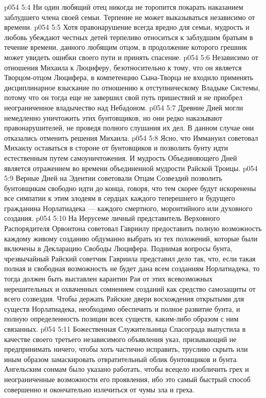 \vs p054 5:4 \pc {}\bibnobreakspace Ни один любящий отец никогда не торопится покарать наказанием заблудшего члена своей семьи. Терпение не может выказываться независимо от времени.
\vs p054 5:5 \pc {}\bibnobreakspace Хотя правонарушение всегда вредно для семьи, мудрость и любовь убеждают честных детей терпеливо относиться к заблудшим братьям в течение времени, данного любящим отцом, в продолжение которого грешник может увидеть ошибки своего пути и принять спасение.
\vs p054 5:6 \pc {}\bibnobreakspace Независимо от отношения Михаила к Люциферу, безотносительно к тому, что он является Творцом\hyp{}отцом Люцифера, в компетенцию Сына\hyp{}Творца не входило применять дисциплинарное взыскание по отношению к отступническому Владыке Системы, потому что он тогда еще не завершил свой путь пришествий и не приобрел неограниченное владычество над Небадоном.
\vs p054 5:7 \pc {}\bibnobreakspace Древние Дней могли немедленно уничтожить этих бунтовщиков, но они редко наказывают правонарушителей, не проведя полного слушания их дел. В данном случае они отказались отменить решения Михаила.
\vs p054 5:8 \pc {}\bibnobreakspace Ясно, что Иммануил советовал Михаилу оставаться в стороне от бунтовщиков и позволить бунту идти естественным путем самоуничтожения. И мудрость Объединяющего Дней является отражением во времени объединенной мудрости Райской Троицы.
\vs p054 5:9 \pc {}\bibnobreakspace Верные Дней на Эдентии советовали Отцам Созвездий позволить бунтовщикам свободно идти до конца, говоря, что тем скорее будут искоренены все симпатии к этим злодеям в сердцах каждого теперешнего и будущего гражданина Норлатиадека --- каждого смертного, моронтийного или духовного создания.
\vs p054 5:10 \pc {}\bibnobreakspace На Иерусеме личный представитель Верховного Распорядителя Орвонтона советовал Гавриилу предоставить полную возможность каждому живому созданию обдуманно выбрать из тех положений, которые были включены в Декларацию Свободы Люцифера. Поднимая вопросы бунта, чрезвычайный Райский советчик Гавриила представил дело так, что, если такая полная и свободная возможность не будет дана всем созданиям Норлатиадека, то тогда должен быть выставлен карантин Рая от этих всевозможных нерешительных и охваченных сомнением созданий как средство самозащиты от всего созвездия. Чтобы держать Райские двери восхождения открытыми для существ Норлатиадека, необходимо обеспечить и полное развитие бунта, и полную определенность позиции всех существ, каким\hyp{}либо образом с ним связанных.
\vs p054 5:11 \pc {}\bibnobreakspace Божественная Служительница Спасограда выпустила в качестве своего третьего независимого объявления указ, призывающий не предпринимать ничего, чтобы хоть частично исправить, трусливо скрыть или иным образом замаскировать отвратительный облик бунтовщиков и бунта. Ангельским сонмам было указано работать, чтобы всецело изобличить грех и неограниченные возможности его проявления, ибо это самый быстрый способ совершенно и окончательно излечиться от чумы зла и греха.

